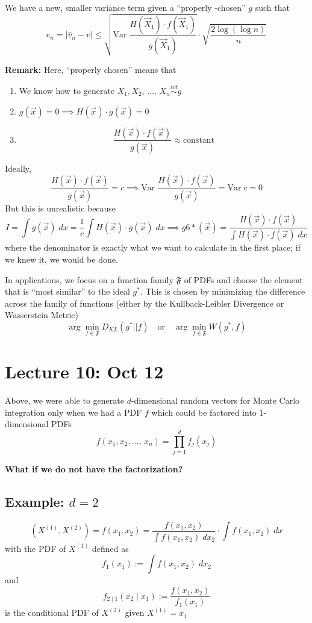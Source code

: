 \documentclass[12pt]{article}
\renewcommand{\hat}[1]{\widehat{#1}}
\newcommand{\Var}{\text{Var}\;}
\begin{document}
We have a new, smaller variance term given a ``properly -chosen'' $g$ such that 
\[e_n = \big\vert \hat v_n - v\big\vert \leq \sqrt{\Var \frac{H(\vec X_1) \cdot f(\vec X_1)}{g(\vec X_1)}} \cdot \sqrt{\frac{2 \log(\log n)}{n}}\]

\textbf{Remark:} Here, ``properly chosen'' means that
\begin{enumerate}
    \item We know how to generate $X_1, X_2, \, \dots,\, X_n \overset{iid}{\sim} g$
    \item $g(\vec x) = 0 \implies H(\vec x) \cdot g(\vec x) = 0$
    \item \[\frac{H(\vec x) \cdot f(\vec x)}{g(\vec x)} \approx \text{constant}\]
\end{enumerate}

Ideally, 
\[\frac{H(\vec x) \cdot f(\vec x)}{g(\vec x)} = c \implies \Var \frac{H(\vec x) \cdot f(\vec x)}{g(\vec x)} = \Var c = 0\]
But this is unrealistic because 
\[I = \int g(\vec x) \; dx = \frac{1}{c} \int H(\vec x) \cdot g(\vec x) \; dx \implies g6*(\vec x) = \frac{H(\vec x) \cdot f(\vec x)}{\int H(\vec x) \cdot f(\vec x)\; dx}\]
where the denominator is exactly what we want to calculate in the first place; if we knew it, we would be done.  

In applications, we focus on a function family $\mathfrak{F}$ of PDFs and choose the element that is ``most similar'' to the ideal $g^*$. This is chosen by minimizing the difference across the family of functions (either by the Kullback-Leibler Divergence or Wasserstein Metric)
\[\arg\min_{f\in \mathfrak{F}} D_{KL}(g^* \big\vert \big\vert f) \quad \text{or} \quad \arg\min_{f \in \mathfrak{F}}W(g^*, f)\]

\section{Lecture 10: Oct 12}
Above, we were able to generate $d$-dimensional random vectors for Monte Carlo integration only when we had a PDF $f$ which could be factored into 1-dimensional PDFs 
\[f(x_1, x_2, \dots,\, x_n) = \prod_{j=1}^d f_j(x_j)\]

\textbf{What if we do not have the factorization?}

\subsection{Example: $d = 2$}
\[(X^{(1)}, X^{(2)}) = f(x_1, x_2) = \frac{f(x_1, x_2)}{\int f(x_1, x_2)\; dx_2} \cdot \int f(x_1, x_2)\; dx\]
with the PDF of $X^{(1)}$ defined as 
\[f_1(x_1) := \int f(x_1, x_2)\; dx_2\]
and 
\[f_{2\; | \;1}(x_2 \; | \; x_1) := \frac{f(x_1, x_2)}{f_1(x_1)}\]
is the conditional PDF of $X^{(2)}$ given $X^{(1)} = x_1$
\end{document}
